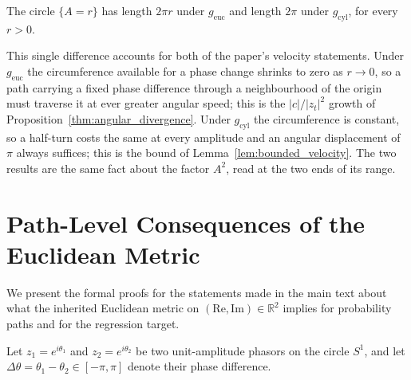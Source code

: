 \begin{corollary}[Circumference]
\label{cor:circumference}
The circle $\{A = r\}$ has length $2\pi r$ under $g_{\mathrm{euc}}$ and length $2\pi$ under $g_{\mathrm{cyl}}$, for every $r > 0$.
\end{corollary}

This single difference accounts for both of the paper's velocity statements. Under $g_{\mathrm{euc}}$ the circumference available for a phase change shrinks to zero as $r \to 0$, so a path carrying a fixed phase difference through a neighbourhood of the origin must traverse it at ever greater angular speed; this is the $|c| / |z_t|^2$ growth of Proposition~\ref{thm:angular_divergence}. Under $g_{\mathrm{cyl}}$ the circumference is constant, so a half-turn costs the same at every amplitude and an angular displacement of $\pi$ always suffices; this is the bound of Lemma~\ref{lem:bounded_velocity}. The two results are the same fact about the factor $A^2$, read at the two ends of its range.

\section{Path-Level Consequences of the Euclidean Metric}
\label{sec:app_proofs}

We present the formal proofs for the statements made in the main text about what the inherited Euclidean metric on $(\mathrm{Re}, \mathrm{Im}) \in \mathbb{R}^2$ implies for probability paths and for the regression target.

Let $z_1 = e^{i\theta_1}$ and $z_2 = e^{i\theta_2}$ be two unit-amplitude phasors on the circle $S^1$, and let $\Delta\theta = \theta_1 - \theta_2 \in [-\pi, \pi]$ denote their phase difference.

